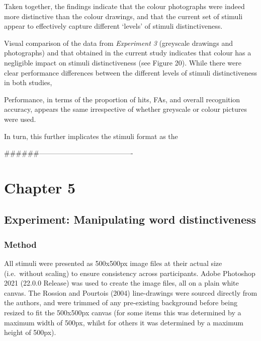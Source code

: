 \documentclass[
  11pt,
]{article}
\begin{document}
Taken together, the findings indicate that the colour photographs were
indeed more distinctive than the colour drawings, and that the current
set of stimuli appear to effectively capture different `levels' of
stimuli distinctiveness.

Visual comparison of the data from \emph{Experiment 3} (greyscale
drawings and photographs) and that obtained in the current study
indicates that colour has a negligible impact on stimuli distinctiveness
(see Figure 20). While there were clear performance differences between
the different levels of stimuli distinctiveness in both studies,

Performance, in terms of the proportion of hits, FAs, and overall
recognition accuracy, appears the same irrespective of whether greyscale
or colour pictures were used.

In turn, this further implicates the stimuli format as the

\#\#\#\#\#\#----------------------------------------

\newpage

\hypertarget{chapter-5}{%
\section{Chapter 5}\label{chapter-5}}

\hypertarget{experiment-manipulating-word-distinctiveness}{%
\subsection{Experiment: Manipulating word
distinctiveness}\label{experiment-manipulating-word-distinctiveness}}

\hypertarget{method-4}{%
\subsubsection{Method}\label{method-4}}

All stimuli were presented as 500x500px image files at their actual size
(i.e.~without scaling) to ensure consistency across participants. Adobe
Photoshop 2021 (22.0.0 Release) was used to create the image files, all
on a plain white canvas. The Rossion and Pourtois (2004) line-drawings
were sourced directly from the authors, and were trimmed of any
pre-existing background before being resized to fit the 500x500px canvas
(for some items this was determined by a maximum width of 500px, whilst
for others it was determined by a maximum height of 500px).
\end{document}
